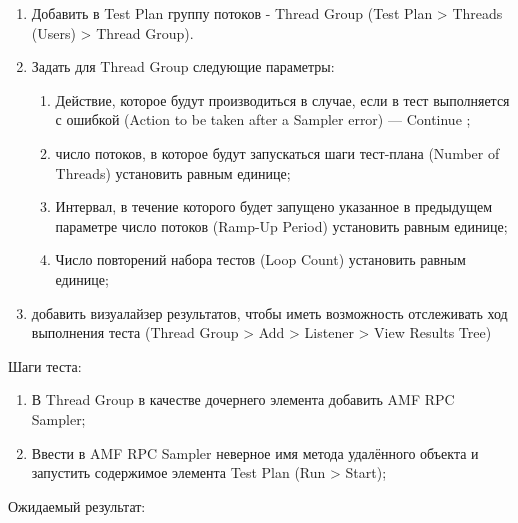 \begin{enumerate}
\item Добавить в Test Plan группу потоков - Thread Group (Test Plan > Threads (Users) > Thread Group).
\item Задать для Thread Group следующие параметры:

\begin{enumerate}
\item Действие, которое будут производиться в случае, если в тест выполняется с ошибкой
(Action to be taken after a Sampler error) --- Continue ;
\item число потоков, в которое будут запускаться шаги тест-плана (Number of Threads) установить равным единице;
\item Интервал, в течение которого будет запущено указанное в предыдущем параметре
число потоков (Ramp-Up Period) установить равным единице;
\item Число повторений набора тестов (Loop Count) установить равным единице;
\end{enumerate}

\item добавить визуалайзер результатов, чтобы иметь возможность отслеживать ход выполнения теста (Thread Group >
Add > Listener > View Results Tree)
\end{enumerate}

Шаги теста:

\begin{enumerate}
\item В Thread Group в качестве дочернего элемента добавить AMF RPC Sampler;
\item Ввести в AMF RPC Sampler неверное имя метода удалённого объекта и запустить содержимое элемента Test Plan (Run > Start);
\end{enumerate}

Ожидаемый результат:


